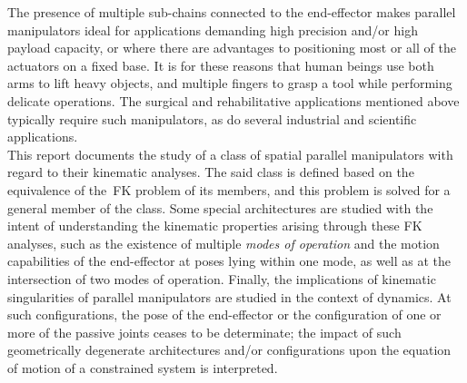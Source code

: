 \documentclass[DD]{iitmdiss}
\begin{document}
The presence of multiple sub-chains connected to the end-effector makes parallel manipulators ideal for applications demanding high precision and/or high payload capacity, or where there are advantages to positioning most or all of the actuators on a fixed base. It is for these reasons that human beings use both arms to lift heavy objects, and multiple fingers to grasp a tool while performing delicate operations. The surgical and rehabilitative applications mentioned above typically require such manipulators, as do several industrial and scientific applications.\\
This report documents the study of a class of spatial parallel manipulators with regard to their kinematic analyses. The said class is defined based on the equivalence of the~FK problem of its members, and this problem is solved for a general member of the class. Some special architectures are studied with the intent of understanding the kinematic properties arising through these FK analyses, such as the existence of multiple \emph{modes of operation} and the motion capabilities of the end-effector at poses lying within one mode, as well as at the intersection of two modes of operation. Finally, the implications of kinematic singularities of parallel manipulators are studied in the context of dynamics. At such configurations, the pose of the end-effector or the configuration of one or more of the passive joints ceases to be determinate; the impact of such geometrically degenerate architectures and/or configurations upon the equation of motion of a constrained system is interpreted.
%
\end{document}
